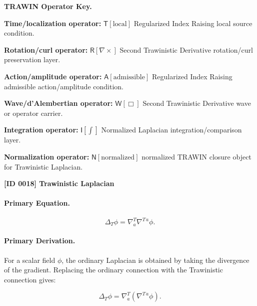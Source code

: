 \par\vspace{0.45\baselineskip}
\noindent\begin{minipage}[t]{\linewidth}
\begingroup
\small
\raggedright
\textbf{TRAWIN Operator Key.}\par
\noindent\textbf{Time/localization operator:} $\mathsf{T}\!\left[\mathrm{local}\right]$ Regularized Index Raising local source condition.\par
\noindent\textbf{Rotation/curl operator:} $\mathsf{R}\!\left[\nabla\times\right]$ Second Trawinistic Derivative rotation/curl preservation layer.\par
\noindent\textbf{Action/amplitude operator:} $\mathsf{A}\!\left[\mathrm{admissible}\right]$ Regularized Index Raising admissible action/amplitude condition.\par
\noindent\textbf{Wave/d'Alembertian operator:} $\mathsf{W}\!\left[\Box\right]$ Second Trawinistic Derivative wave or operator carrier.\par
\noindent\textbf{Integration operator:} $\mathsf{I}\!\left[\int\right]$ Normalized Laplacian integration/comparison layer.\par
\noindent\textbf{Normalization operator:} $\mathsf{N}\!\left[\mathrm{normalized}\right]$ normalized TRAWIN closure object for Trawinistic Laplacian.\par
\endgroup
\end{minipage}

\clearpage
\noindent\textbf{[ID 0018] Trawinistic Laplacian}\par
\vspace{0.35em}
\paragraph{Primary Equation.}
\begin{equation}
\Delta_T\phi
=
\nabla^{T}_{a}\nabla^{T\,a}\phi .
\end{equation}

\paragraph{Primary Derivation.}
For a scalar field $\phi$, the ordinary Laplacian is obtained by taking the divergence of the gradient.  
Replacing the ordinary connection with the Trawinistic connection gives:

\begin{equation}
\Delta_T\phi
=
\nabla^{T}_{a}
\left(
\nabla^{T\,a}\phi
\right).
\end{equation}

